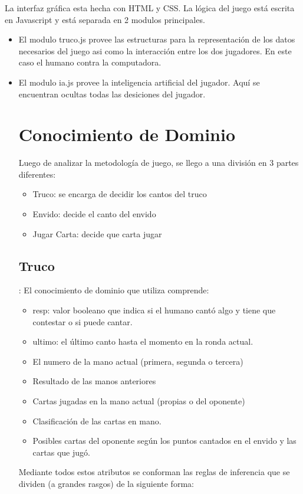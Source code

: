 \documentclass[12pt,a4paper]{article}
\begin{document}
La interfaz gr\'afica esta hecha con HTML y CSS. La l\'ogica del juego est\'a escrita en Javascript y est\'a separada en 2 modulos principales.  
\begin{itemize}
\item El modulo truco.js provee las estructuras para la representación de los datos necesarios del juego asi como la interacci\'on entre los dos jugadores. 
En este caso el humano contra la computadora. 

\item El modulo ia.js provee la inteligencia artificial del jugador. Aqu\'i se encuentran ocultas todas las desiciones del jugador.


\section{Conocimiento de Dominio}
Luego de analizar la metodología de juego, se llego a una división en 3 partes diferentes:
\begin{itemize}
\item Truco: se encarga de decidir los cantos del truco
\item Envido: decide el canto del envido
\item Jugar Carta: decide que carta jugar
\end{itemize}
 

\subsection{Truco}:
El conocimiento de dominio que utiliza comprende:
\begin{itemize}
\item resp: valor booleano que indica si el humano cantó algo y tiene que contestar o si puede cantar.
\item ultimo: el último canto hasta el momento en la ronda actual.
\item El numero de la mano actual (primera, segunda o tercera)
\item Resultado de las manos anteriores
\item Cartas jugadas en la mano actual (propias o del oponente)
\item Clasificación de las cartas en mano.
\item Posibles cartas del oponente según los puntos cantados en el envido y las cartas que jugó.
\end{itemize}

Mediante todos estos atributos se conforman las reglas de inferencia que se dividen (a grandes rasgos) de la 
siguiente forma:


\end{itemize}
\end{document}
